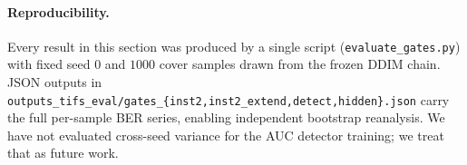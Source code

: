 \paragraph{Reproducibility.}
Every result in this section was produced by a single script
(\texttt{evaluate\_gates.py}) with fixed seed $0$ and $1000$ cover
samples drawn from the frozen DDIM chain. JSON outputs in
\texttt{outputs\_tifs\_eval/gates\_\{inst2,inst2\_extend,detect,hidden\}.json}
carry the full per-sample BER series, enabling independent bootstrap
reanalysis. We have not evaluated cross-seed variance for the AUC
detector training; we treat that as future work.
